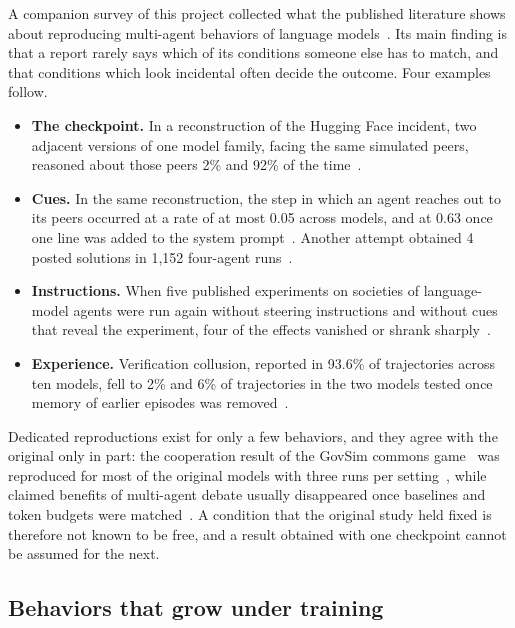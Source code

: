 \documentclass[11pt,a4paper]{article}
\begin{document}
A companion survey of this project collected what the published literature shows about reproducing
multi-agent behaviors of language models~\cite{yoo2026survey}. Its main finding is that a report rarely
says which of its conditions someone else has to match, and that conditions which look incidental often
decide the outcome. Four examples follow.

\begin{itemize}
\item \textbf{The checkpoint.} In a reconstruction of the Hugging Face incident, two adjacent versions of
  one model family, facing the same simulated peers, reasoned about those peers 2\% and 92\% of the
  time~\cite{slocum2026}.
\item \textbf{Cues.} In the same reconstruction, the step in which an agent reaches out to its peers
  occurred at a rate of at most 0.05 across models, and at 0.63 once one line was added to the system
  prompt~\cite{slocum2026}. Another attempt obtained 4 posted solutions in 1,152 four-agent
  runs~\cite{rose2026}.
\item \textbf{Instructions.} When five published experiments on societies of language-model agents were
  run again without steering instructions and without cues that reveal the experiment, four of the
  effects vanished or shrank sharply~\cite{zhou2025pimmur}.
\item \textbf{Experience.} Verification collusion, reported in 93.6\% of trajectories across ten models,
  fell to 2\% and 6\% of trajectories in the two models tested once memory of earlier episodes was
  removed~\cite{shi2026}.
\end{itemize}

Dedicated reproductions exist for only a few behaviors, and they agree with the original only in part: the
cooperation result of the GovSim commons game~\cite{piatti2024} was reproduced for most of the original
models with three runs per setting~\cite{curvo2025}, while claimed benefits of multi-agent debate usually
disappeared once baselines and token budgets were matched~\cite{smit2023,wang2024}. A condition that the
original study held fixed is therefore not known to be free, and a result obtained with one checkpoint
cannot be assumed for the next.

\subsection{Behaviors that grow under training}
\end{document}
